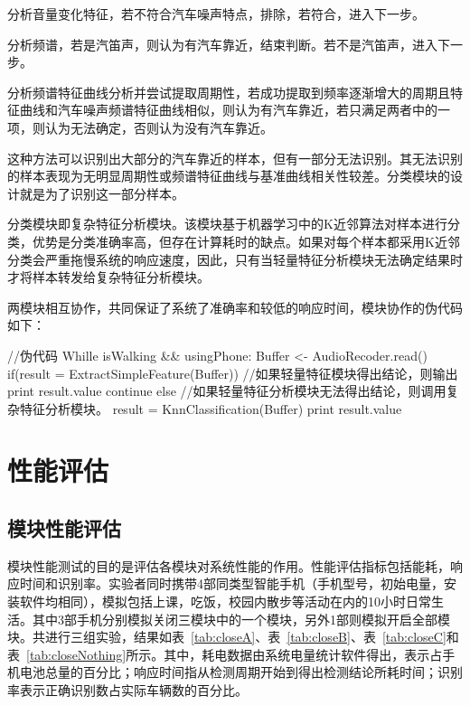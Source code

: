 \begin{compactenum}
\item 分析音量变化特征，若不符合汽车噪声特点，排除，若符合，进入下一步。
\item 分析频谱，若是汽笛声，则认为有汽车靠近，结束判断。若不是汽笛声，进入下一步。
\item 分析频谱特征曲线分析并尝试提取周期性，若成功提取到频率逐渐增大的周期且特征曲线和汽车噪声频谱特征曲线相似，则认为有汽车靠近，若只满足两者中的一项，则认为无法确定，否则认为没有汽车靠近。
\end{compactenum}

这种方法可以识别出大部分的汽车靠近的样本，但有一部分无法识别。其无法识别的样本表现为无明显周期性或频谱特征曲线与基准曲线相关性较差。分类模块的设计就是为了识别这一部分样本。

分类模块即复杂特征分析模块。该模块基于机器学习中的K近邻算法对样本进行分类，优势是分类准确率高，但存在计算耗时的缺点。如果对每个样本都采用K近邻分类会严重拖慢系统的响应速度，因此，只有当轻量特征分析模块无法确定结果时才将样本转发给复杂特征分析模块。

两模块相互协作，共同保证了系统了准确率和较低的响应时间，模块协作的伪代码如下：

\begin{code}[numbers=none]
//伪代码
Whille isWalking && usingPhone:
    Buffer <- AudioRecoder.read()
    if(result = ExtractSimpleFeature(Buffer))
        //如果轻量特征模块得出结论，则输出
        print result.value
        continue
    else
        //如果轻量特征分析模块无法得出结论，则调用复杂特征分析模块。
        result = KnnClassification(Buffer)
        print result.value

\end{code}



\section{性能评估}

\subsection{模块性能评估}
模块性能测试的目的是评估各模块对系统性能的作用。性能评估指标包括能耗，响应时间和识别率。实验者同时携带4部同类型智能手机（手机型号，初始电量，安装软件均相同），模拟包括上课，吃饭，校园内散步等活动在内的10小时日常生活。其中3部手机分别模拟关闭三模块中的一个模块，另外1部则模拟开启全部模块。共进行三组实验，结果如表~\ref{tab:closeA}、表~\ref{tab:closeB}、表~\ref{tab:closeC}和表~\ref{tab:closeNothing}所示。其中，耗电数据由系统电量统计软件得出，表示占手机电池总量的百分比；响应时间指从检测周期开始到得出检测结论所耗时间；识别率表示正确识别数占实际车辆数的百分比。


